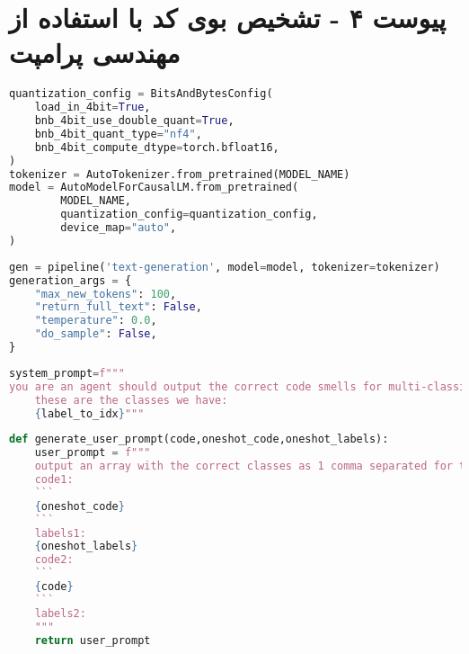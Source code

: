 \chapter*{پیوست ۴ - تشخیص بوی کد با استفاده از مهندسی پرامپت}
\label{appendix:4}
\begin{latin}
    \begin{lstlisting}[language=Python, title=\rl{بارگزاری مدل زبانی برای کار تولید متن بصورت کوانتیزه}]
quantization_config = BitsAndBytesConfig(
    load_in_4bit=True,
    bnb_4bit_use_double_quant=True,
    bnb_4bit_quant_type="nf4",
    bnb_4bit_compute_dtype=torch.bfloat16,
)
tokenizer = AutoTokenizer.from_pretrained(MODEL_NAME)
model = AutoModelForCausalLM.from_pretrained(
        MODEL_NAME,
        quantization_config=quantization_config,
        device_map="auto",
)
\end{lstlisting}
\end{latin}

\begin{latin}
    \begin{lstlisting}[language=Python, title=\rl{تعریف پایپلاین تولید متن}]
gen = pipeline('text-generation', model=model, tokenizer=tokenizer)
generation_args = {
    "max_new_tokens": 100,
    "return_full_text": False,
    "temperature": 0.0,
    "do_sample": False,
}
\end{lstlisting}
\end{latin}

\begin{latin}
    \begin{lstlisting}[language=Python, title=\rl{تعریف پرامپت سیستم}]
system_prompt=f"""
you are an agent should output the correct code smells for multi-classification problem.
    these are the classes we have:
    {label_to_idx}"""
\end{lstlisting}
\end{latin}

\begin{latin}
    \begin{lstlisting}[language=Python, title=\rl{تولید پراپمت کاربر بصورت \lr{one-shot}}]
def generate_user_prompt(code,oneshot_code,oneshot_labels):
    user_prompt = f"""
    output an array with the correct classes as 1 comma separated for the code below:
    code1:
    ```
    {oneshot_code}
    ```
    labels1:
    {oneshot_labels}
    code2:
    ```
    {code}
    ```
    labels2:
    """
    return user_prompt
\end{lstlisting}
\end{latin}


